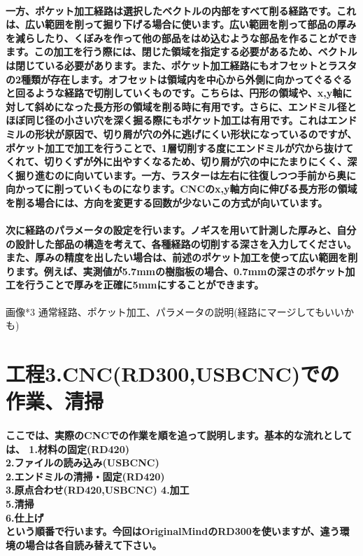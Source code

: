 \documentclass[b5paper, 9pt, twocolumn, titlepage,openany]{jsbook}%
\begin{document}
\paragraph{一方、ポケット加工経路は選択したベクトルの内部をすべて削る経路です。これは、広い範囲を削って掘り下げる場合に使います。広い範囲を削って部品の厚みを減らしたり、くぼみを作って他の部品をはめ込むような部品を作ることができます。この加工を行う際には、閉じた領域を指定する必要があるため、ベクトルは閉じている必要があります。また、ポケット加工経路にもオフセットとラスタの2種類が存在します。オフセットは領域内を中心から外側に向かってぐるぐると回るような経路で切削していくものです。こちらは、円形の領域や、x,y軸に対して斜めになった長方形の領域を削る時に有用です。さらに、エンドミル径とほぼ同じ径の小さい穴を深く掘る際にもポケット加工は有用です。これはエンドミルの形状が原因で、切り屑が穴の外に逃げにくい形状になっているのですが、ポケット加工で加工を行うことで、1層切削する度にエンドミルが穴から抜けてくれて、切りくずが外に出やすくなるため、切り屑が穴の中にたまりにくく、深く掘り進むのに向いています。一方、ラスターは左右に往復しつつ手前から奥に向かってに削っていくものになります。CNCのx,y軸方向に伸びる長方形の領域を削る場合には、方向を変更する回数が少ないこの方式が向いています。}
\paragraph{次に経路のパラメータの設定を行います。ノギスを用いて計測した厚みと、自分の設計した部品の構造を考えて、各種経路の切削する深さを入力してください。また、厚みの精度を出したい場合は、前述のポケット加工を使って広い範囲を削ります。例えば、実測値が5.7mmの樹脂板の場合、0.7mmの深さのポケット加工を行うことで厚みを正確に5mmにすることができます。}

画像*3 通常経路、ポケット加工、パラメータの説明(経路にマージしてもいいかも)

\section{工程3.CNC(RD300,USBCNC)での作業、清掃}
\paragraph{ここでは、実際のCNCでの作業を順を追って説明します。基本的な流れとしては、
1.材料の固定(RD420)\\
2.ファイルの読み込み(USBCNC)\\
2.エンドミルの清掃・固定(RD420)\\
3.原点合わせ(RD420,USBCNC)
4.加工\\
5.清掃\\
6.仕上げ\\
という順番で行います。今回はOriginalMindのRD300を使いますが、違う環境の場合は各自読み替えて下さい。}
\end{document}
